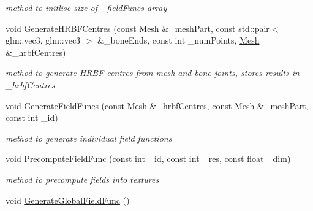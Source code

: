 \begin{DoxyCompactItemize}
\begin{DoxyCompactList}\small\item\em method to initlise size of \+\_\+field\+Funcs array \end{DoxyCompactList}\item 
void \hyperlink{classGlobalFieldFunction_ac7b6f9c16ac3ad7dc1200bafa1a4649d}{Generate\+H\+R\+B\+F\+Centres} (const \hyperlink{classMesh}{Mesh} \&\+\_\+mesh\+Part, const std\+::pair$<$ glm\+::vec3, glm\+::vec3 $>$ \&\+\_\+bone\+Ends, const int \+\_\+num\+Points, \hyperlink{classMesh}{Mesh} \&\+\_\+hrbf\+Centres)
\begin{DoxyCompactList}\small\item\em method to generate H\+R\+BF centres from mesh and bone joints, stores results in \+\_\+hrbf\+Centres \end{DoxyCompactList}\item 
void \hyperlink{classGlobalFieldFunction_a32583dc655877c87063c28363fddf675}{Generate\+Field\+Funcs} (const \hyperlink{classMesh}{Mesh} \&\+\_\+hrbf\+Centres, const \hyperlink{classMesh}{Mesh} \&\+\_\+mesh\+Part, const int \+\_\+id)
\begin{DoxyCompactList}\small\item\em method to generate individual field functions \end{DoxyCompactList}\item 
void \hyperlink{classGlobalFieldFunction_ac670342d15dbc08ede726af118e7ac7a}{Precompute\+Field\+Func} (const int \+\_\+id, const int \+\_\+res, const float \+\_\+dim)
\begin{DoxyCompactList}\small\item\em method to precompute fields into textures \end{DoxyCompactList}\item 
void \hyperlink{classGlobalFieldFunction_a359ad40bd85555529a05f4ba8c52dea5}{Generate\+Global\+Field\+Func} ()\hypertarget{classGlobalFieldFunction_a359ad40bd85555529a05f4ba8c52dea5}{}\label{classGlobalFieldFunction_a359ad40bd85555529a05f4ba8c52dea5}


\end{DoxyCompactItemize}
